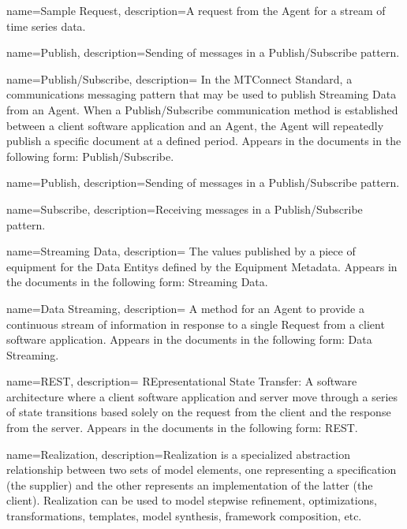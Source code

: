 {
    name={Sample Request},
	description={A request from the \gls{Agent} for a stream of time series data.}
}

{
    name={Publish},
	description={Sending of messages in a \gls{Publish/Subscribe} pattern.}
}

{
    name={Publish/Subscribe},
	description={
	In the MTConnect Standard, a communications messaging pattern that may be used to publish \gls{Streaming Data} from an \gls{Agent}.  When a \gls{Publish/Subscribe} communication method is established between a client software application and an \gls{Agent}, the \gls{Agent} will repeatedly publish a specific  document at a defined period.
	Appears in the documents in the following form: \gls{Publish/Subscribe}.
}
}

{
    name={Publish},
	description={Sending of messages in a \gls{Publish/Subscribe} pattern.}
}

{
    name={Subscribe},
	description={Receiving messages in a \gls{Publish/Subscribe} pattern.}
}

{
    name={Streaming Data},
	description={
	The values published by a piece of equipment for the \glspl{Data Entity} defined by the \gls{Equipment Metadata}.
	Appears in the documents in the following form: \gls{Streaming Data}.
}
}

{
    name={Data Streaming},
	description={
	A method for an \gls{Agent} to provide a continuous stream of information in response to a single \gls{Request} from a client software application.
	Appears in the documents in the following form: \gls{Data Streaming}.
}
}

{
    name={REST},
	description={
	REpresentational State Transfer:  A software architecture where a client software application and server move through a series of state transitions based solely on the request from the client and the response from the server. 
	Appears in the documents in the following form: REST.
}
}

{
    name={Realization},
	description={Realization is a specialized abstraction relationship between two sets of model elements, one representing a specification (the supplier) and the other represents an implementation of the latter (the client). Realization can be used to model stepwise refinement, optimizations, transformations, templates, model synthesis, framework composition, etc.}
}


